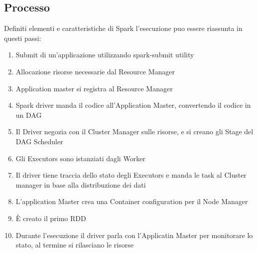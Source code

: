 \subsection{Processo}
Definiti elementi e caratteristiche di Spark l'esecuzione puo essere riassunta 
in questi passi:
\begin{enumerate}
    \item Submit di un'applicazione utilizzando spark-submit utility
    \item Allocazione risorse necessarie dal Resource Manager
    \item Application master si registra al Resource Manager
    \item Spark driver manda il codice all'Application Master, convertendo il codice
    in un DAG
    \item Il Driver negozia con il Cluster Manager sulle risorse, e si creano gli Stage del 
    DAG Scheduler
    \item Gli Executors sono istanziati dagli Worker
    \item Il driver tiene traccia dello stato degli Executors e manda le task al 
    Cluster manager in base alla distribuzione dei dati
    \item L'application Master crea una Container configuration per il Node Manager
    \item È creato il primo RDD
    \item Durante l'esecuzione il driver parla con l'Applicatin Master per monitorare
    lo stato, al termine si rilasciano le risorse
\end{enumerate}

